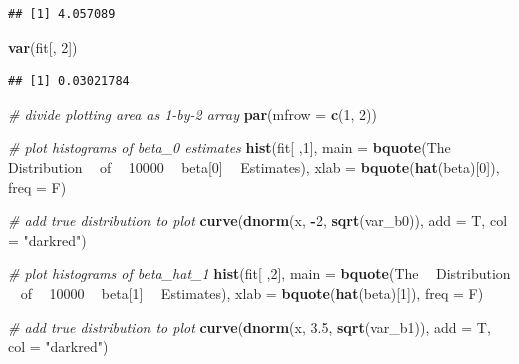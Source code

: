 \documentclass[]{book}
\newenvironment{Shaded}{\begin{snugshade}}{\end{snugshade}}
\newcommand{\KeywordTok}[1]{\textcolor[rgb]{0.13,0.29,0.53}{\textbf{#1}}}
\newcommand{\DataTypeTok}[1]{\textcolor[rgb]{0.13,0.29,0.53}{#1}}
\newcommand{\DecValTok}[1]{\textcolor[rgb]{0.00,0.00,0.81}{#1}}
\newcommand{\FloatTok}[1]{\textcolor[rgb]{0.00,0.00,0.81}{#1}}
\newcommand{\StringTok}[1]{\textcolor[rgb]{0.31,0.60,0.02}{#1}}
\newcommand{\CommentTok}[1]{\textcolor[rgb]{0.56,0.35,0.01}{\textit{#1}}}
\newcommand{\OperatorTok}[1]{\textcolor[rgb]{0.81,0.36,0.00}{\textbf{#1}}}
\newcommand{\NormalTok}[1]{#1}
\theoremstyle{definition}
\theoremstyle{definition}
\theoremstyle{definition}
\theoremstyle{remark}
\begin{document}
\begin{verbatim}
## [1] 4.057089
\end{verbatim}

\begin{Shaded}
\begin{Highlighting}[]
\KeywordTok{var}\NormalTok{(fit[, }\DecValTok{2}\NormalTok{])}
\end{Highlighting}
\end{Shaded}

\begin{verbatim}
## [1] 0.03021784
\end{verbatim}

\begin{Shaded}
\begin{Highlighting}[]
\CommentTok{# divide plotting area as 1-by-2 array}
\KeywordTok{par}\NormalTok{(}\DataTypeTok{mfrow =} \KeywordTok{c}\NormalTok{(}\DecValTok{1}\NormalTok{, }\DecValTok{2}\NormalTok{))}

\CommentTok{# plot histograms of beta_0 estimates}
\KeywordTok{hist}\NormalTok{(fit[ ,}\DecValTok{1}\NormalTok{], }
     \DataTypeTok{main =} \KeywordTok{bquote}\NormalTok{(The }\OperatorTok{~}\StringTok{ }\NormalTok{Distribution  }\OperatorTok{~}\StringTok{ }\NormalTok{of }\OperatorTok{~}\StringTok{ }\DecValTok{10000} \OperatorTok{~}\StringTok{ }\NormalTok{beta[}\DecValTok{0}\NormalTok{] }\OperatorTok{~}\StringTok{ }\NormalTok{Estimates), }
     \DataTypeTok{xlab =} \KeywordTok{bquote}\NormalTok{(}\KeywordTok{hat}\NormalTok{(beta)[}\DecValTok{0}\NormalTok{]), }
     \DataTypeTok{freq =}\NormalTok{ F)}

\CommentTok{# add true distribution to plot}
\KeywordTok{curve}\NormalTok{(}\KeywordTok{dnorm}\NormalTok{(x, }\OperatorTok{-}\DecValTok{2}\NormalTok{, }\KeywordTok{sqrt}\NormalTok{(var_b0)), }\DataTypeTok{add =}\NormalTok{ T, }\DataTypeTok{col =} \StringTok{"darkred"}\NormalTok{)}

\CommentTok{# plot histograms of beta_hat_1 }
\KeywordTok{hist}\NormalTok{(fit[ ,}\DecValTok{2}\NormalTok{], }
     \DataTypeTok{main =} \KeywordTok{bquote}\NormalTok{(The }\OperatorTok{~}\StringTok{ }\NormalTok{Distribution  }\OperatorTok{~}\StringTok{ }\NormalTok{of }\OperatorTok{~}\StringTok{ }\DecValTok{10000} \OperatorTok{~}\StringTok{ }\NormalTok{beta[}\DecValTok{1}\NormalTok{] }\OperatorTok{~}\StringTok{ }\NormalTok{Estimates), }
     \DataTypeTok{xlab =} \KeywordTok{bquote}\NormalTok{(}\KeywordTok{hat}\NormalTok{(beta)[}\DecValTok{1}\NormalTok{]), }
     \DataTypeTok{freq =}\NormalTok{ F)}

\CommentTok{# add true distribution to plot}
\KeywordTok{curve}\NormalTok{(}\KeywordTok{dnorm}\NormalTok{(x, }\FloatTok{3.5}\NormalTok{, }\KeywordTok{sqrt}\NormalTok{(var_b1)), }\DataTypeTok{add =}\NormalTok{ T, }\DataTypeTok{col =} \StringTok{"darkred"}\NormalTok{)}
\end{Highlighting}
\end{Shaded}
\end{document}

